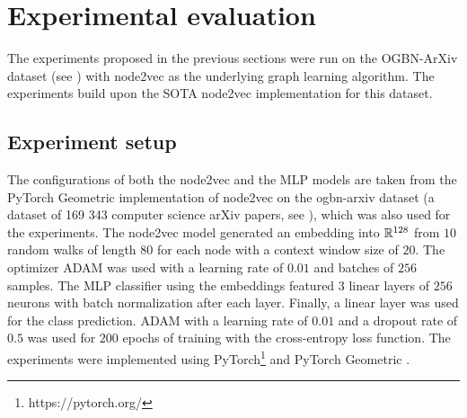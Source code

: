 \section{Experimental evaluation}\label{sec:experiments}

The experiments proposed in the previous sections were run on the OGBN-ArXiv dataset (see \cite{hu_open_2021}) with node2vec as the underlying graph learning algorithm. The experiments build upon the SOTA node2vec implementation for this dataset.

\subsection{Experiment setup}

The configurations of both the node2vec and the MLP models are taken from the PyTorch Geometric implementation of node2vec on the ogbn-arxiv dataset (a dataset of 169 343 computer science arXiv papers, see \cite{paszke_pytorch_2019}), which was also used for the experiments. The node2vec model generated an embedding into \( \mathbb{R}^{128} \) from \( 10 \) random walks of length \( 80 \) for each node with a context window size of \( 20 \). The optimizer ADAM \cite{kingma_adam:_2017} was used with a learning rate of \( 0.01 \) and batches of \( 256 \) samples. The MLP classifier using the embeddings featured \( 3 \) linear layers of \( 256 \) neurons with batch normalization after each layer. Finally, a linear layer was used for the class prediction. ADAM with a learning rate of \( 0.01 \) and a dropout rate of \( 0.5 \) was used for \( 200 \) epochs of training with the cross-entropy loss function. The experiments were implemented using PyTorch\footnote{https://pytorch.org/} and PyTorch Geometric \cite{paszke_pytorch_2019}.

